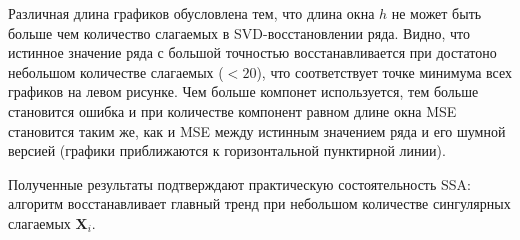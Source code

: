 \documentclass[12pt, twoside]{article}
\begin{document}
Различная длина графиков обусловлена тем, что длина окна $h$ не может быть больше чем количество слагаемых в SVD-восстановлении ряда. Видно, что истинное значение ряда с большой точностью восстанавливается при достатоно небольшом количестве слагаемых ($<20$), что соответствует точке минимума всех графиков на левом рисунке. Чем больше компонет используется, тем больше становится ошибка и при количестве компонент равном длине окна MSE становится таким же, как и MSE между истинным значением ряда и его шумной версией (графики приближаются к горизонтальной пунктирной линии).


Полученные результаты подтверждают практическую состоятельность SSA: алгоритм восстанавливает главный тренд при небольшом количестве сингулярных слагаемых $\mathbf{X}_i$.

\newpage


\end{document}
